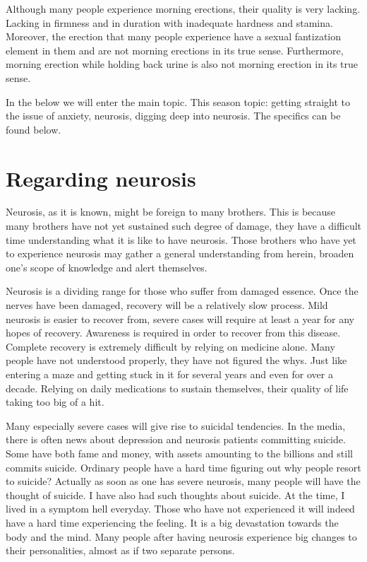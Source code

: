 \documentclass[
]{book}
\begin{document}
Although many people experience morning erections, their quality is very lacking. Lacking in firmness and in duration with inadequate hardness and stamina. Moreover, the erection that many people experience have a sexual fantization element in them and are not morning erections in its true sense. Furthermore, morning erection while holding back urine is also not morning erection in its true sense.

In the below we will enter the main topic. This season topic: getting straight to the issue of anxiety, neurosis, digging deep into neurosis. The specifics can be found below.

\hypertarget{regarding-neurosis}{%
\section{Regarding neurosis}\label{regarding-neurosis}}

Neurosis, as it is known, might be foreign to many brothers. This is because many brothers have not yet sustained such degree of damage, they have a difficult time understanding what it is like to have neurosis. Those brothers who have yet to experience neurosis may gather a general understanding from herein, broaden one's scope of knowledge and alert themselves.

Neurosis is a dividing range for those who suffer from damaged essence. Once the nerves have been damaged, recovery will be a relatively slow process. Mild neurosis is easier to recover from, severe cases will require at least a year for any hopes of recovery. Awareness is required in order to recover from this disease. Complete recovery is extremely difficult by relying on medicine alone. Many people have not understood properly, they have not figured the whys. Just like entering a maze and getting stuck in it for several years and even for over a decade. Relying on daily medications to sustain themselves, their quality of life taking too big of a hit.

Many especially severe cases will give rise to suicidal tendencies. In the media, there is often news about depression and neurosis patients committing suicide. Some have both fame and money, with assets amounting to the billions and still commits suicide. Ordinary people have a hard time figuring out why people resort to suicide? Actually as soon as one has severe neurosis, many people will have the thought of suicide. I have also had such thoughts about suicide. At the time, I lived in a symptom hell everyday. Those who have not experienced it will indeed have a hard time experiencing the feeling. It is a big devastation towards the body and the mind. Many people after having neurosis experience big changes to their personalities, almost as if two separate persons.
\end{document}

